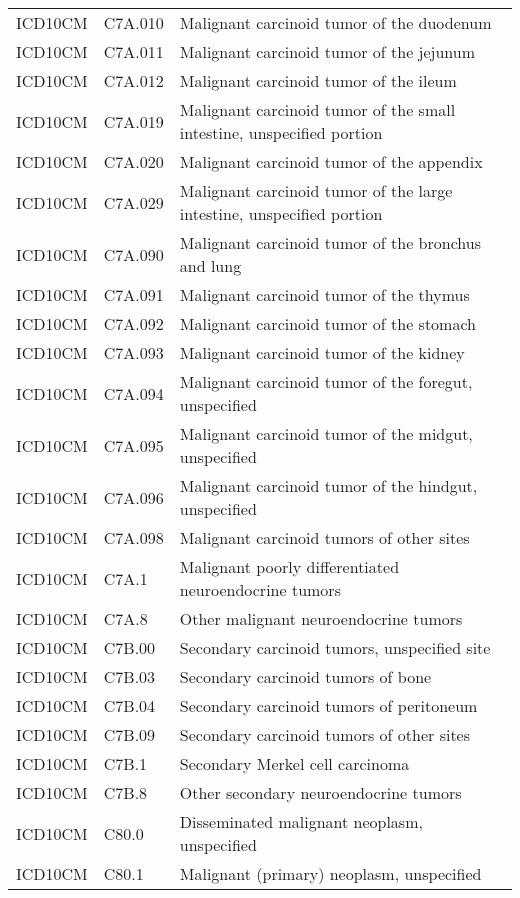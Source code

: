 \begin{longtable}{p{}p{}p{}}
  ICD10CM & C7A.010 & Malignant carcinoid tumor of the duodenum \\ 
  ICD10CM & C7A.011 & Malignant carcinoid tumor of the jejunum \\ 
  ICD10CM & C7A.012 & Malignant carcinoid tumor of the ileum \\ 
  ICD10CM & C7A.019 & Malignant carcinoid tumor of the small intestine, unspecified portion \\ 
  ICD10CM & C7A.020 & Malignant carcinoid tumor of the appendix \\ 
  ICD10CM & C7A.029 & Malignant carcinoid tumor of the large intestine, unspecified portion \\ 
  ICD10CM & C7A.090 & Malignant carcinoid tumor of the bronchus and lung \\ 
  ICD10CM & C7A.091 & Malignant carcinoid tumor of the thymus \\ 
  ICD10CM & C7A.092 & Malignant carcinoid tumor of the stomach \\ 
  ICD10CM & C7A.093 & Malignant carcinoid tumor of the kidney \\ 
  ICD10CM & C7A.094 & Malignant carcinoid tumor of the foregut, unspecified \\ 
  ICD10CM & C7A.095 & Malignant carcinoid tumor of the midgut, unspecified \\ 
  ICD10CM & C7A.096 & Malignant carcinoid tumor of the hindgut, unspecified \\ 
  ICD10CM & C7A.098 & Malignant carcinoid tumors of other sites \\ 
  ICD10CM & C7A.1 & Malignant poorly differentiated neuroendocrine tumors \\ 
  ICD10CM & C7A.8 & Other malignant neuroendocrine tumors \\ 
  ICD10CM & C7B.00 & Secondary carcinoid tumors, unspecified site \\ 
  ICD10CM & C7B.03 & Secondary carcinoid tumors of bone \\ 
  ICD10CM & C7B.04 & Secondary carcinoid tumors of peritoneum \\ 
  ICD10CM & C7B.09 & Secondary carcinoid tumors of other sites \\ 
  ICD10CM & C7B.1 & Secondary Merkel cell carcinoma \\ 
  ICD10CM & C7B.8 & Other secondary neuroendocrine tumors \\ 
  ICD10CM & C80.0 & Disseminated malignant neoplasm, unspecified \\ 
  ICD10CM & C80.1 & Malignant (primary) neoplasm, unspecified \\ 

\end{longtable}
